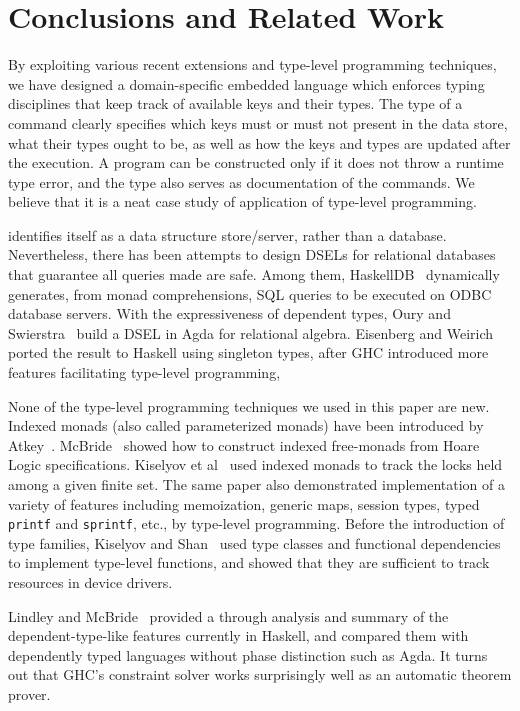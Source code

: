 
\section{Conclusions and Related Work}
\label{sec:conclusions}

By exploiting various recent extensions and type-level programming techniques,
we have designed a domain-specific embedded language \Edis{} which enforces
typing disciplines that keep track of available keys and their types. The
type of a command clearly specifies which keys must or must not present in
the data store, what their types ought to be, as well as how the keys and types are updated after the execution. A program can be constructed only if it does
not throw a runtime type error, and the type also serves as documentation of the
commands. We believe that it is a neat case study of application of type-level programming.

\Redis{} identifies itself as a data structure store/server, rather than a
database. Nevertheless, there has been attempts to design DSELs for relational
databases that guarantee all queries made are safe. Among them, {\sc HaskellDB}~\cite{haskelldb,haskelldbimproved} dynamically generates, from monad comprehensions, SQL queries to be executed on ODBC database servers.
With the expressiveness of dependent types, Oury and Swierstra~\cite{pi}
build a DSEL in Agda for relational algebra. Eisenberg and
Weirich~\cite{singletons} ported the result to Haskell using singleton types, after GHC introduced more features facilitating type-level programming,

None of the type-level programming techniques we used in this paper are new.
Indexed monads (also called parameterized monads) have been introduced by
Atkey~\cite{indexedmonad}. McBride~\cite{kleisli} showed how to construct
indexed free-monads from Hoare Logic specifications. Kiselyov et
al~\cite{typefun} used indexed monads to track the locks held among a given
finite set. The same paper also demonstrated implementation of a variety of
features including memoization, generic maps, session types, typed
\texttt{printf} and \texttt{sprintf}, etc., by type-level programming.
Before the introduction of type families, Kiselyov and
Shan~\cite{staticresources} used type classes and functional dependencies to
implement type-level functions, and showed that they are sufficient to track
resources in device drivers.

Lindley and McBride~\cite{phasedistinction} provided a through analysis and summary of the dependent-type-like features currently in Haskell, and
compared them with dependently typed languages without phase distinction such as Agda. It turns out that GHC's constraint solver works surprisingly well as an
automatic theorem prover.
